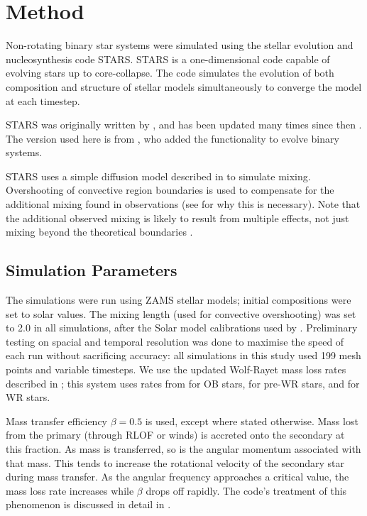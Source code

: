 \section{Method} %

Non-rotating binary star systems were simulated using the stellar evolution and nucleosynthesis code STARS.
STARS is a one-dimensional code capable of evolving stars up to core-collapse.
The code simulates the evolution of both composition and structure of stellar models simultaneously to converge the model at each timestep.

STARS was originally written by \cite{1971MNRAS.151..351E}, and has been updated many times since then \citep[e.g.][]{1995MNRAS.274..964P}.
The version used here is from \cite{2009MNRAS.396.1699S}, who added the functionality to evolve binary systems.

STARS uses a simple diffusion model described in \cite{1972MNRAS.156..361E} to simulate mixing.
Overshooting of convective region boundaries is used to compensate for the additional mixing found in observations (see \cite{1991A&AS...89..451M} for why this is necessary). Note that the additional observed mixing is likely to result from multiple effects, not just mixing beyond the theoretical boundaries \citep{2015A&A...575A.117S}.

\subsection{Simulation Parameters} \label{Method2}

The simulations were run using ZAMS stellar models; initial compositions were set to solar values.
The mixing length (used for convective overshooting) was set to 2.0 in all simulations, after the Solar model calibrations used by \cite{2015A&A...575A.117S}.
Preliminary testing on spacial and temporal resolution was done to maximise the speed of each run without sacrificing accuracy: all simulations in this study used 199 mesh points and variable timesteps.
We use the updated Wolf-Rayet mass loss rates described in \cite{Eldridge2006}; this system uses rates from \cite{MassLossRates1} for OB stars, \cite{MassLossRates2} for pre-WR stars, and \cite{MassLossRates3} for WR stars.

Mass transfer efficiency $\beta = 0.5$ is used, except where stated otherwise. Mass lost from the primary (through RLOF or winds) is accreted onto the secondary at this fraction.
As mass is transferred, so is the angular momentum associated with that mass. This tends to increase the rotational velocity of the secondary star during mass transfer. As the angular frequency approaches a critical value, the mass loss rate increases while $\beta$ drops off rapidly. 
The code's treatment of this phenomenon is discussed in detail in \cite{2009MNRAS.396.1699S}.

